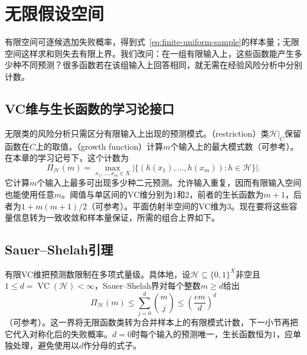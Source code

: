 \section{无限假设空间}
\label{sec:binary-infinite-class}

有限空间可逐候选加失败概率，得到式~\eqref{eq:finite-uniform-sample}的样本量；无限空间这样求和则失去有限上界。我们改问：在一组有限输入上，这些函数能产生多少种不同预测？很多函数若在该组输入上回答相同，就无需在经验风险分析中分别计数。

\subsection{VC维与生长函数的学习论接口}
\label{sec:binary-shattering-vc}

无限类的风险分析只需区分有限输入上出现的预测模式。（restriction）类$\mathcal H|_C$保留函数在$C$上的取值，（growth function）计算$m$个输入上的最大模式数（可参考）。在本章的学习记号下，这个计数为
\begin{equation}
 \Pi_{\mathcal H}(m)
 =\max_{x_1,\ldots,x_m\in X}
   \left|\{(h(x_1),\ldots,h(x_m)):h\in\mathcal H\}\right|.
 \label{eq:learning-growth-function}
\end{equation}
它计算$m$个输入上最多可出现多少种二元预测。允许输入重复，因而有限输入空间也能使用任意$m$。阈值与单区间的VC维分别为1和2，前者的生长函数为$m+1$，后者为$1+m(m+1)/2$（可参考）。平面仿射半空间的VC维为3。现在要将这些容量信息转为一致收敛和样本量保证，所需的组合上界如下。

\subsection{Sauer--Shelah引理}
\label{sec:binary-growth-sauer}

\label{lem:learning-sauer-shelah}
有限VC维把预测数限制在多项式量级。具体地，设$\mathcal H\subseteq\{0,1\}^X$非空且$1\leq d=\operatorname{VC}(\mathcal H)<\infty$，Sauer--Shelah界对每个整数$m\geq d$给出
\begin{equation}
 \Pi_{\mathcal H}(m)
 \leq\sum_{j=0}^{d}\binom{m}{j}
 \leq\left(\frac{em}{d}\right)^d
 \label{eq:learning-sauer-shelah}
\end{equation}
（可参考）。这一界将无限函数类转为合并样本上的有限模式计数，下一小节再把它代入对称化后的失败概率。$d=0$时每个输入的预测唯一，生长函数恒为1，应单独处理，避免使用以$d$作分母的式子。

